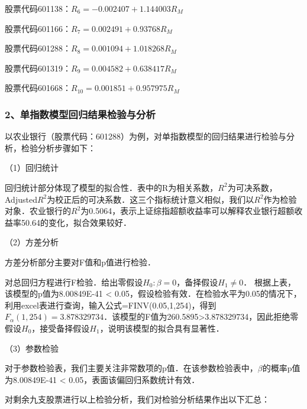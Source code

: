 股票代码601138：$R_{6}=-0.002407 + 1.144003R_{M}$

股票代码601166：$R_{7}=0.002491 + 0.93768R_{M}$

股票代码601288：$R_{8}=0.001094 + 1.018268R_{M}$

股票代码601319：$R_{9}=0.004582+0.638417R_{M}$

股票代码601668：$R_{10}=0.001851+0.957975R_{M}$


\subsubsection{2、单指数模型回归结果检验与分析}
以农业银行（股票代码：601288）为例，对单指数模型的回归结果进行检验与分析，检验分析步骤如下：

（1）回归统计

回归统计部分体现了模型的拟合性．表中的R为相关系数，$R^{2}$为可决系数，Adjusted$R^{2}$为校正后的可决系数．这三个指标统计意义相似，我们以$R^{2}$作为检验对象．农业银行的$R^{2}$为0.5064，表示上证综指超额收益率可以解释农业银行超额收益率50.64的变化，拟合效果较好．

（2）方差分析

方差分析部分主要对F值和p值进行检验．

对总回归方程进行F检验．给出零假设$H_{0}: \beta=0$，备择假设$H_{1}\ne0$．
根据上表，该模型的p值为8.00849E-41 < 0.05，假设检验有效．在检验水平为0.05的情况下，利用excel表进行查询，输入公式=FINV(0.05,1,254)，得到$F_{\alpha}(1,254)=3.878329734$．该模型的F值为260.5895>3.878329734，因此拒绝零假设$H_{0}$，接受备择假设$H_{1}$，说明该模型的拟合具有显著性．

（3）参数检验

对于参数检验表，我们主要关注非常数项的p值．在该参数检验表中，$\beta$的概率p值为8.00849E-41 < 0.05，表面该偏回归系数统计有效．

对剩余九支股票进行以上检验分析，我们对检验分析结果作出以下汇总：


